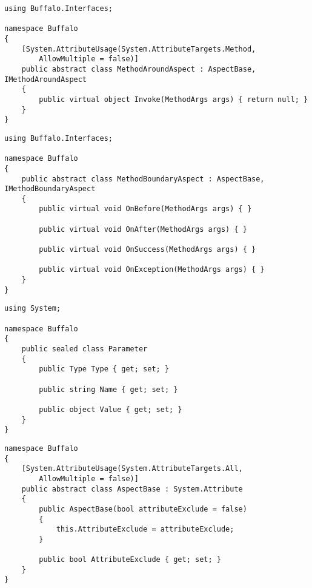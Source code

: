 \begin{lstlisting}[caption={../buffalo/MethodAroundAspect.cs}, label=../buffalo/MethodAroundAspect.cs, frame=tb, basicstyle=\scriptsize]﻿using Buffalo.Interfaces;

namespace Buffalo
{
    [System.AttributeUsage(System.AttributeTargets.Method,
        AllowMultiple = false)]
    public abstract class MethodAroundAspect : AspectBase, IMethodAroundAspect
    {
        public virtual object Invoke(MethodArgs args) { return null; }
    }
}
\end{lstlisting}

\begin{lstlisting}[caption={../buffalo/MethodBoundaryAspect.cs}, label=../buffalo/MethodBoundaryAspect.cs, frame=tb, basicstyle=\scriptsize]﻿using Buffalo.Interfaces;

namespace Buffalo
{
    public abstract class MethodBoundaryAspect : AspectBase, IMethodBoundaryAspect
    {
        public virtual void OnBefore(MethodArgs args) { }

        public virtual void OnAfter(MethodArgs args) { }

        public virtual void OnSuccess(MethodArgs args) { }

        public virtual void OnException(MethodArgs args) { }
    }
}
\end{lstlisting}

\begin{lstlisting}[caption={../buffalo/Parameter.cs}, label=../buffalo/Parameter.cs, frame=tb, basicstyle=\scriptsize]﻿using System;

namespace Buffalo
{
    public sealed class Parameter
    {
        public Type Type { get; set; }

        public string Name { get; set; }

        public object Value { get; set; }
    }
}
\end{lstlisting}

\begin{lstlisting}[caption={../buffalo/AspectBase.cs}, label=../buffalo/AspectBase.cs, frame=tb, basicstyle=\scriptsize]﻿namespace Buffalo
{
    [System.AttributeUsage(System.AttributeTargets.All,
        AllowMultiple = false)]
    public abstract class AspectBase : System.Attribute
    {
        public AspectBase(bool attributeExclude = false)
        {
            this.AttributeExclude = attributeExclude;
        }

        public bool AttributeExclude { get; set; }
    }
}
\end{lstlisting}

